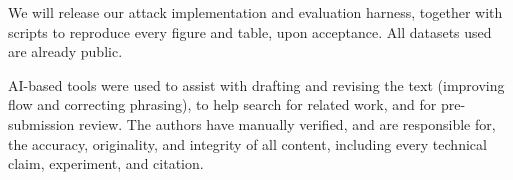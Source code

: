 \documentclass[sigconf,anonymous,review]{acmart}
\begin{document}
\begin{openscience}
We will release our attack implementation and evaluation harness, together with scripts
to reproduce every figure and table, upon acceptance. All datasets used are already public.
\end{openscience}

\begin{ai}
AI-based tools were used to assist with drafting and revising the text (improving flow and
correcting phrasing), to help search for related work, and for pre-submission review. The
authors have manually verified, and are responsible for, the accuracy, originality, and
integrity of all content, including every technical claim, experiment, and citation.
\end{ai}




\end{document}

